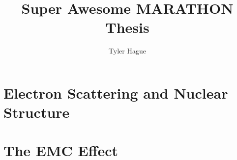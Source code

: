 \documentclass[11pt]{ksudiss}                          %
\title{Super Awesome MARATHON Thesis}         %
\author{Tyler Hague}
\begin{document}

%  


\makefrontmatter




%  


\mainmatter

%

\chapter{\bf{Electron Scattering and Nuclear Structure}}             %


\chapter{\bf{The EMC Effect}}             %

\end{document}
